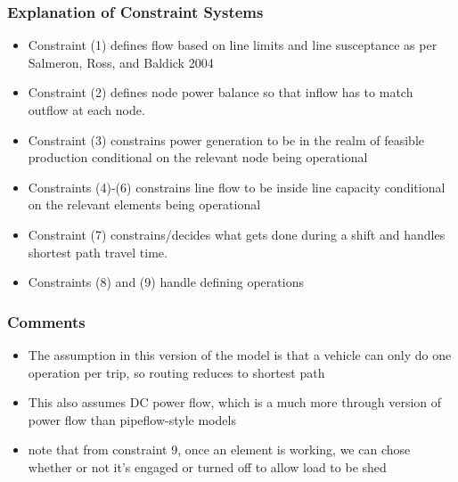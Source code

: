 \documentclass{article}
\begin{document}
	\subsubsection{Explanation of Constraint Systems}
	\begin{itemize}
		\item Constraint (1) defines flow based on line limits and line susceptance as per Salmeron, Ross, and Baldick 2004\cite{SalmeronEA2004}
		\item Constraint (2) defines node power balance so that inflow has to match outflow at each node.
		\item Constraint (3) constrains power generation to be in the realm of feasible production conditional on the relevant node being operational
		\item Constraints (4)-(6) constrains line flow to be inside line capacity conditional on the relevant elements being operational
		\item Constraint (7) constrains/decides what gets done during a shift and handles shortest path travel time.
		\item Constraints (8) and (9) handle defining operations
	\end{itemize}
	\subsubsection{Comments}
	\begin{itemize}
		\item The assumption in this version of the model is that a vehicle can only do one operation per trip, so routing reduces to shortest path
		\item This also assumes DC power flow, which is a much more through version of power flow than pipeflow-style models
		\item note that from constraint 9, once an element is working, we can chose whether or not it's engaged or turned off to allow load to be shed
	\end{itemize}
\end{document}
